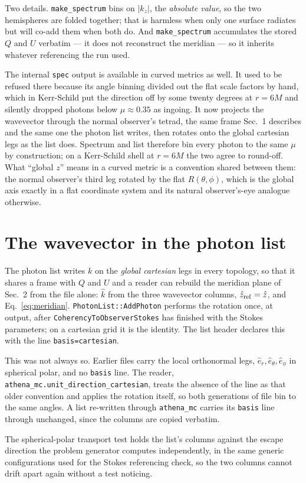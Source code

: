 \documentclass[11pt]{article}
\newcommand{\zref}{\hat{z}_{\rm ref}}
\newcommand{\khat}{\hat{k}}
\begin{document}
Two details. \texttt{make\_spectrum} bins on $|k_z|$, the \emph{absolute value}, so the two
hemispheres are folded together; that is harmless when only one surface radiates but will
co-add them when both do. And \texttt{make\_spectrum} accumulates the stored $Q$ and $U$
verbatim --- it does not reconstruct the meridian --- so it inherits whatever referencing the
run used.

The internal \texttt{spec} output is available in curved metrics as well. It used to be
refused there because its angle binning divided out the flat scale factors by hand, which in
Kerr-Schild put the direction off by some twenty degrees at $r = 6M$ and silently dropped
photons below $\mu \approx 0.35$ as ingoing. It now projects the wavevector through the
normal observer's tetrad, the same frame Sec.~1 describes and the same one the photon list
writes, then rotates onto the global cartesian legs as the list does. Spectrum and list
therefore bin every photon to the same $\mu$ by construction; on a Kerr-Schild shell at
$r = 6M$ the two agree to round-off. What ``global $z$'' means in a curved metric is a
convention shared between them: the normal observer's third leg rotated by the flat
$R(\theta,\phi)$, which is the global axis exactly in a flat coordinate system and its natural
observer's-eye analogue otherwise.

\section{The wavevector in the photon list}

The photon list writes $k$ on the \emph{global cartesian} legs in every topology, so that
it shares a frame with $Q$ and $U$ and a reader can rebuild the meridian plane of Sec.~2
from the file alone: $\khat$ from the three wavevector columns, $\zref = \hat{z}$, and
Eq.~\eqref{eq:meridian}. \texttt{PhotonList::AddPhoton} performs the rotation once, at
output, after \texttt{CoherencyToObserverStokes} has finished with the Stokes parameters;
on a cartesian grid it is the identity. The list header declares this with the line
\texttt{basis=cartesian}.

This was not always so. Earlier files carry the local orthonormal legs, $\hat{e}_r,
\hat{e}_\theta, \hat{e}_\phi$ in spherical polar, and no \texttt{basis} line. The reader,
\texttt{athena\_mc.unit\_direction\_cartesian}, treats the absence of the line as that
older convention and applies the rotation itself, so both generations of file bin to the
same angles. A list re-written through \texttt{athena\_mc} carries its \texttt{basis} line
through unchanged, since the columns are copied verbatim.

The spherical-polar transport test holds the list's columns against the escape direction
the problem generator computes independently, in the same generic configurations used for
the Stokes referencing check, so the two columns cannot drift apart again without a test
noticing.
\end{document}
